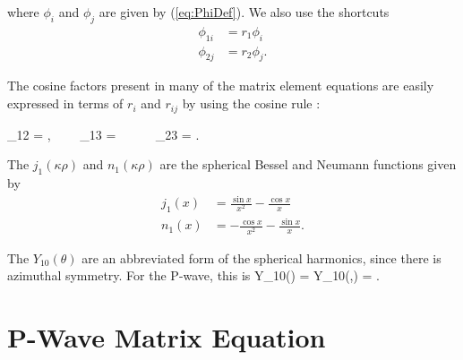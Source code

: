 \documentclass[Dissertation.tex]{subfiles}
\begin{document}
\noindent where $\phi_i$ and $\phi_j$ are given by (\ref{eq:PhiDef}).  We also use the shortcuts
\begin{subequations}
\label{eq:PWavePhi}
\begin{align}
\phi_{1i} &= r_1 \phi_i \\
\phi_{2j} &= r_2 \phi_j.
\end{align}
\end{subequations}

The cosine factors present in many of the matrix element equations are easily expressed in terms of $r_i$ and $r_{ij}$ by using the cosine rule \cite{?}:

\beq
\label{eq:Cosines}
\cos\theta_{12} = , \ \ \ \ \cos\theta_{13} =  \ \ \   \ \ \cos\theta_{23} = .
\eeq

\noindent The $j_1(\kappa\rho)$ and $n_1(\kappa\rho)$ are the spherical Bessel and Neumann functions given by \cite[p. 729]{Arfken2005}
\begin{subequations}
\label{eq:PWaveBessel}
\begin{align}
j_1(x) & = \frac{\sin x}{x^2} - \frac{\cos x}{x} \label{eq:Bessel1} \\
n_1(x) & = -\frac{\cos x}{x^2} - \frac{\sin x}{x}. \label{eq:Neumann1}
\end{align}
\end{subequations}

\noindent The $Y_{10}(\theta)$ are an abbreviated form of the spherical harmonics, since there is azimuthal symmetry.  For the P-wave, this is
\beq
\label{eq:PWaveSpherHarm}
Y_{10}(\theta) = Y_{10}(\theta,\varphi) =  \cos\theta.
\eeq


\section{P-Wave Matrix Equation}
\label{sec:PWaveMatrix}
\end{document}
